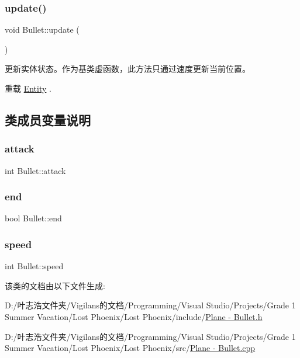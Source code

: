 \mbox{\label{class_bullet_a32f4a0611fe2dd245fee955d14ca1f68}} 
\subsubsection{\texorpdfstring{update()}{update()}}
{\footnotesize\ttfamily void Bullet\+::update (\begin{DoxyParamCaption}{ }\end{DoxyParamCaption})\hspace{0.3cm}{\ttfamily [virtual]}}



更新实体状态。作为基类虚函数，此方法只通过速度更新当前位置。 



重载 \hyperlink{class_entity_a00b6eeaf99b35c8f8b10b5fbfc1baf4f}{Entity} .



\subsection{类成员变量说明}
\mbox{\label{class_bullet_ab9e1e40341cddf25f8acc4e378b26f4a}} 
\subsubsection{\texorpdfstring{attack}{attack}}
{\footnotesize\ttfamily int Bullet\+::attack}

\mbox{\label{class_bullet_aff37198e603e1a2b8ff28e0df6e156a4}} 
\subsubsection{\texorpdfstring{end}{end}}
{\footnotesize\ttfamily bool Bullet\+::end}

\mbox{\label{class_bullet_a110bd4348fc7547125b4ec4bbf94d5f5}} 
\subsubsection{\texorpdfstring{speed}{speed}}
{\footnotesize\ttfamily int Bullet\+::speed}



该类的文档由以下文件生成\+:\begin{DoxyCompactItemize}
\item 
D\+:/叶志浩文件夹/\+Vigilans的文档/\+Programming/\+Visual Studio/\+Projects/\+Grade 1 Summer Vacation/\+Lost Phoenix/\+Lost Phoenix/include/\hyperlink{_plane_01-_01_bullet_8h}{Plane -\/ Bullet.\+h}\item 
D\+:/叶志浩文件夹/\+Vigilans的文档/\+Programming/\+Visual Studio/\+Projects/\+Grade 1 Summer Vacation/\+Lost Phoenix/\+Lost Phoenix/src/\hyperlink{_plane_01-_01_bullet_8cpp}{Plane -\/ Bullet.\+cpp}\end{DoxyCompactItemize}
